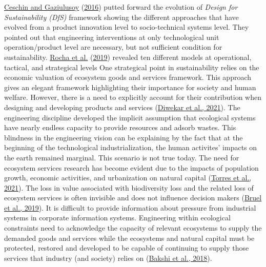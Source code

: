 \documentclass[]{elsarticle} %
\begin{document}
\protect\hyperlink{ref-Ceschin2016}{Ceschin and Gaziulusoy} (\protect\hyperlink{ref-Ceschin2016}{2016}) putted forward the evolution of \emph{Design for Sustainability (DfS)} framework showing the different approaches that have evolved from a product innovation level to socio-technical systems level.
They pointed out that engineering interventions at only technological unit operation/product level are necessary, but not sufficient condition for sustainability.
\protect\hyperlink{ref-SousaRocha2019}{Rocha et al.} (\protect\hyperlink{ref-SousaRocha2019}{2019}) revealed ten different models at operational, tactical, and strategical levels
One strategical point in sustainability relies on the economic valuation of ecosystem goods and services framework. This approach gives an elegant framework highlighting their importance for society and human welfare.
However, there is a need to explicitly account for their contribution when designing and developing products and services (\protect\hyperlink{ref-Diwekar2021}{Diwekar et al., 2021}).
The engineering discipline developed the implicit assumption that ecological systems have nearly endless capacity to provide resources and adsorb wastes.
This blindness in the engineering vision can be explaining by the fact that at the beginning of the technological industrialization, the human activites' impacts on the earth remained marginal. This scenario is not true today.
The need for ecosystem services research has become evident due to the impacts of population growth, economic activities, and urbanization on natural capital (\protect\hyperlink{ref-Torres2021}{Torres et al., 2021}).
The loss in value associated with biodiversity loss and the related loss of ecosystem services is often invisible and does not influence decision makers (\protect\hyperlink{ref-Bruel2018}{Bruel et al., 2019}).
It is difficult to provide information about pressure from industrial systems in corporate information systems.
Engineering within ecological constraints need to acknowledge the capacity of relevant ecosystems to supply the demanded goods and services while the ecosystems and natural capital must be protected, restored and developed to be capable of continuing to supply those services that industry (and society) relies on (\protect\hyperlink{ref-Bakshi2018}{Bakshi et al., 2018}).
\end{document}
